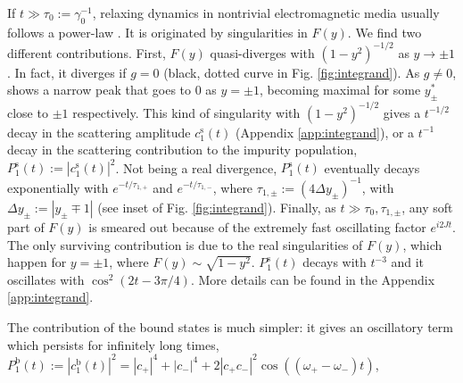 \documentclass[aps,pra,twocolumn,floatfix,superscriptaddress]{revtex4-1}%
\begin{document}
If $t\gg\tau_0:=\gamma_0^{-1}$, relaxing dynamics in nontrivial electromagnetic media usually follows a power-law \cite{Gaveau1995}. It is originated by singularities in $F(y)$. We find two different contributions. First, $F(y)$ quasi-diverges with $(1-y^2)^{-1/2}$ as $y\to\pm 1$. In fact, it diverges if $g=0$ (black, dotted curve in Fig. \ref{fig:integrand}). As $g\neq 0$,  shows a narrow peak that  goes to 0 as $y=\pm 1$, becoming maximal for some $y_\pm^*$ close to $\pm 1$ respectively. This kind of singularity with $(1-y^2)^{-1/2}$ gives a $t^{-1/2}$ decay in the scattering amplitude $c_1^\text{s}(t)$ (Appendix \ref{app:integrand}), or a $t^{-1}$ decay in the scattering contribution to the impurity population, $P_1^\text{s}(t):=|c_1^\text{s}(t)|^2$. Not being a real divergence, $P_1^\text{s}(t)$ eventually decays exponentially with $e^{-t/\tau_{1,+}}$ and $e^{-t/\tau_{1,-}}$, where $\tau_{1,\pm}:=(4 \Delta y_\pm)^{-1}$, with $\Delta y_\pm:= |y_\pm \mp 1|$ (see inset of Fig. \ref{fig:integrand}). Finally, as $t\gg \tau_0,\tau_{1,\pm}$, any soft part of $F(y)$ is smeared out because of the extremely fast oscillating factor $e^{i2Jt}$. The only surviving contribution is due to the real singularities of $F(y)$, which happen for $y= \pm 1$, where $F(y)\sim \sqrt{1-y^2}$. $P_1^\text{s}(t)$ decays with $t^{-3}$ and it oscillates with $\cos^2(2t-3\pi/4)$. More details can be found in the Appendix \ref{app:integrand}.


The contribution of the bound states is much simpler: it gives an oscillatory term which persists for infinitely long times, $P_1^\text{b}(t):=|c_1^\text{b}(t)|^2=|c_+|^4+|c_-|^4+2|c_+c_-|^2\cos((\omega_+-\omega_-)t)$, \cite{Gaveau1995,Lombardo2014}
\end{document}

